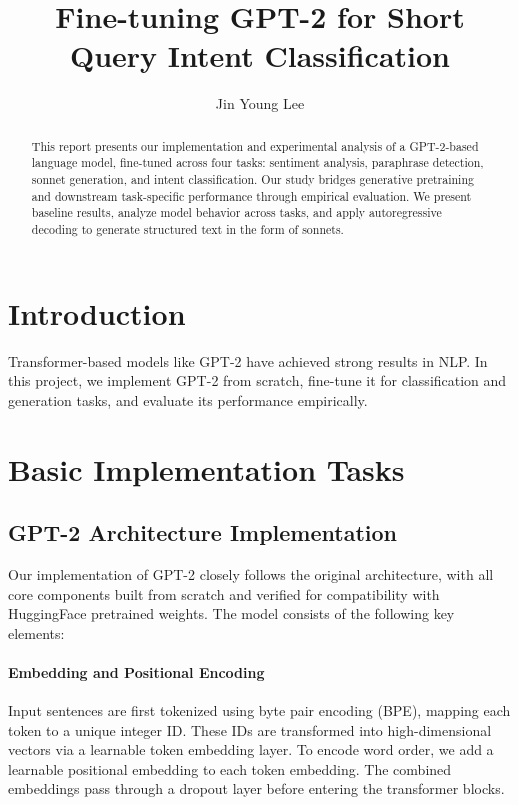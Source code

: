 \documentclass{article}
\title{Fine-tuning GPT-2 for Short Query Intent Classification}
\author{Jin Young Lee}
\begin{document}
\maketitle

\begin{abstract}
This report presents our implementation and experimental analysis of a GPT-2-based language model, fine-tuned across four tasks: sentiment analysis, paraphrase detection, sonnet generation, and intent classification. Our study bridges generative pretraining and downstream task-specific performance through empirical evaluation. We present baseline results, analyze model behavior across tasks, and apply autoregressive decoding to generate structured text in the form of sonnets.
\end{abstract}

\section{Introduction}
Transformer-based models like GPT-2 have achieved strong results in NLP. In this project, we implement GPT-2 from scratch, fine-tune it for classification and generation tasks, and evaluate its performance empirically.

\section{Basic Implementation Tasks}
\subsection{GPT-2 Architecture Implementation}
Our implementation of GPT-2 closely follows the original architecture, with all core components built from scratch and verified for compatibility with HuggingFace pretrained weights. The model consists of the following key elements:

\paragraph{Embedding and Positional Encoding}
Input sentences are first tokenized using byte pair encoding (BPE), mapping each token to a unique integer ID. These IDs are transformed into high-dimensional vectors via a learnable token embedding layer. To encode word order, we add a learnable positional embedding to each token embedding. The combined embeddings pass through a dropout layer before entering the transformer blocks.
\end{document}
